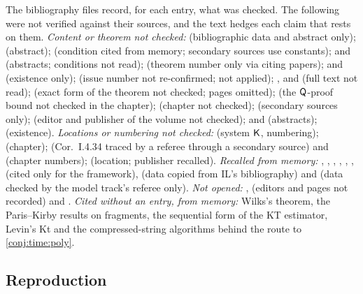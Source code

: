 The bibliography files record, for each entry, what was checked. The following were not verified against their sources, and the text hedges each claim that rests on them. \emph{Content or theorem not checked:} \citet{hutter2007universal} (bibliographic data and abstract only); \citet{leike2015solomonoff} (abstract); \citet{gaifman1964concerning} (condition cited from memory; secondary sources use constants); \citet{berk1966limiting} and \citet{kleijn2006misspecification} (abstracts; conditions not read); \citet{ghosal2017fundamentals} (theorem number only via citing papers); \citet{horning1969study} and \citet{angluin1988identifying} (existence only); \citet{rousseau2011asymptotic} (issue number not re-confirmed; not applied); \citet{craig1953axiomatizability}, \citet{seiferas1978separating} and \citet{zak1983turing} (full text not read); \citet{cook1972hierarchy} (exact form of the theorem not checked; pages omitted); \citet{pudlak1998lengths} (the $\mathsf{Q}$-proof bound not checked in the chapter); \citet{boolos2007computability} (chapter not checked); \citet{shepherdson1964nonstandard} (secondary sources only); \citet{zarach1996replacement} (editor and publisher of the volume not checked); \citet{gitman2016zfc} and \citet{kaye2007interpretations} (abstracts); \citet{kaye1988parameter} (existence). \emph{Locations or numbering not checked:} \citet{mendelson1997introduction} (system $\mathsf{K}$, numbering); \citet{athreya1972branching} (chapter); \citet{hajek1993metamathematics} (Cor.~I.4.34 traced by a referee through a secondary source) and \citet{kaye1991models} (chapter numbers); \citet{shoenfield1967mathematical} (location; publisher recalled). \emph{Recalled from memory:} \citet{church1936note}, \citet{turing1936computable}, \citet{birkhoff1935structure}, \citet{schwarz1978estimating}, \citet{clarke1990information}, \citet{hoeffding1963probability}, \citet{shafer1976mathematical} (cited only for the framework), \citet{ville1939etude} (data copied from IL's bibliography) and \citet{schwartz1965bayes} (data checked by the model track's referee only). \emph{Not opened:} \citet{parikh1973some}, \citet{baaz1993kreisel} (editors and pages not recorded) and \citet{hrubes2007theories}. \emph{Cited without an entry, from memory:} Wilks's theorem, the Paris--Kirby results on fragments, the sequential form of the KT estimator, Levin's Kt and the compressed-string algorithms behind the route to \cref{conj:time:poly}.

\subsection{Reproduction}\label{app:ver:repro}

